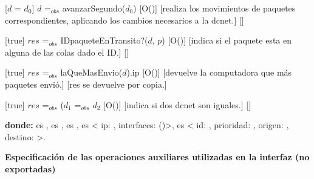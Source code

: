 \begin{Interfaz}
  [$d$ = $d_0$]
  {$d$ =$_{obs}$ avanzarSegundo($d_0$)}%
  [O()]
  [realiza los movimientos de paquetes correspondientes, aplicando los cambios necesarios a la dcnet.]
  []
  
  [true]
  {$res$ =$_{obs}$ IDpaqueteEnTransito?($d$, $p$)}%
  [O()]
  [indica si el paquete esta en alguna de las colas dado el ID.]
  []
  
  [true]
  {$res$ =$_{obs}$ laQueMasEnvio($d$).ip}%
  [O()]
  [devuelve la computadora que m\'as paquetes envi\'o.]
  [res se devuelve por copia.]  
  
  [true]
  {$res$ =$_{obs}$ ($d_1$ =$_{obs}$ $d_2$}%
  [O()]
  [indica si dos dcnet son iguales.]
  []  
  
  \textbf{donde:} \newline  
    es , \newline
    es , \newline
    es , \newline
    es < ip: , interfaces: ()>, \newline
    es < id: , prioridad: , origen: , destino:  >.
   
\end{Interfaz}

\newpage

\textbf{Especificaci\'on de las operaciones auxiliares utilizadas en la interfaz (no exportadas)}

